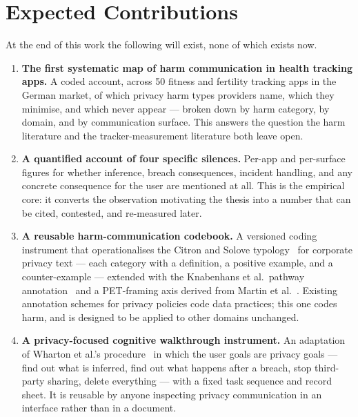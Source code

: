 \section{Expected Contributions}
\label{sec:contributions}

At the end of this work the following will exist, none of which exists now.

\begin{enumerate}[leftmargin=*,itemsep=5pt]
  \item \textbf{The first systematic map of harm communication in health
    tracking apps.} A coded account, across 50 fitness and fertility tracking
    apps in the German market, of which privacy harm types providers name, which
    they minimise, and which never appear --- broken down by harm category, by
    domain, and by communication surface. This answers the question the harm
    literature and the tracker-measurement literature both leave open.

  \item \textbf{A quantified account of four specific silences.} Per-app and
    per-surface figures for whether inference, breach consequences, incident
    handling, and any concrete consequence for the user are mentioned at all.
    This is the empirical core: it converts the observation motivating the
    thesis into a number that can be cited, contested, and re-measured later.

  \item \textbf{A reusable harm-communication codebook.} A versioned coding
    instrument that operationalises the Citron and Solove
    typology~\parencite{citron2021harms} for corporate privacy text --- each
    category with a definition, a positive example, and a counter-example ---
    extended with the Knabenhans et al.\ pathway
    annotation~\parencite{knabenhans2026harms} and a PET-framing axis derived
    from Martin et al.~\parencite{martin2025cookies}. Existing annotation
    schemes for privacy policies code data practices; this one codes harm, and
    is designed to be applied to other domains unchanged.

  \item \textbf{A privacy-focused cognitive walkthrough instrument.} An
    adaptation of Wharton et al.'s
    procedure~\parencite{wharton1994cognitive} in which the user goals are
    privacy goals --- find out what is inferred, find out what happens after a
    breach, stop third-party sharing, delete everything --- with a fixed task
    sequence and record sheet. It is reusable by anyone inspecting privacy
    communication in an interface rather than in a document.


\end{enumerate}
